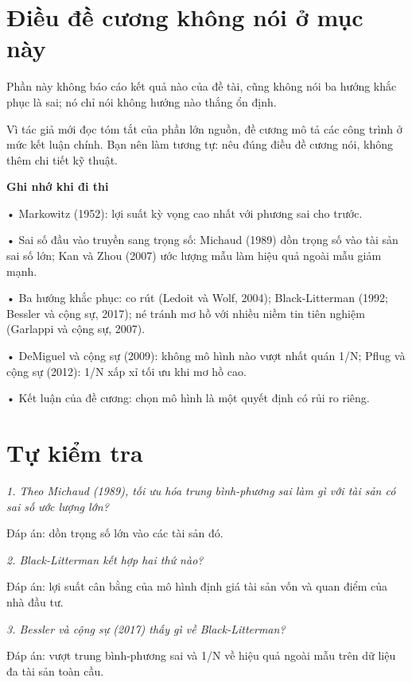 \section{Điều đề cương không nói ở mục này}

Phần này không báo cáo kết quả nào của đề tài, cũng không nói ba hướng khắc phục là sai; nó chỉ nói không hướng nào thắng ổn định.

Vì tác giả mới đọc tóm tắt của phần lớn nguồn, đề cương mô tả các công trình ở mức kết luận chính. Bạn nên làm tương tự: nêu đúng điều đề cương nói, không thêm chi tiết kỹ thuật.

\begin{tcolorbox}[breakable]
\textbf{Ghi nhớ khi đi thi}

• Markowitz (1952): lợi suất kỳ vọng cao nhất với phương sai cho trước.

• Sai số đầu vào truyền sang trọng số: Michaud (1989) dồn trọng số vào tài sản sai số lớn; Kan và Zhou (2007) ước lượng mẫu làm hiệu quả ngoài mẫu giảm mạnh.

• Ba hướng khắc phục: co rút (Ledoit và Wolf, 2004); Black-Litterman (1992; Bessler và cộng sự, 2017); né tránh mơ hồ với nhiều niềm tin tiên nghiệm (Garlappi và cộng sự, 2007).

• DeMiguel và cộng sự (2009): không mô hình nào vượt nhất quán 1/N; Pflug và cộng sự (2012): 1/N xấp xỉ tối ưu khi mơ hồ cao.

• Kết luận của đề cương: chọn mô hình là một quyết định có rủi ro riêng.
\end{tcolorbox}

\section{Tự kiểm tra}

{\itshape 1. Theo Michaud (1989), tối ưu hóa trung bình-phương sai làm gì với tài sản có sai số ước lượng lớn?\par}

Đáp án: dồn trọng số lớn vào các tài sản đó.

{\itshape 2. Black-Litterman kết hợp hai thứ nào?\par}

Đáp án: lợi suất cân bằng của mô hình định giá tài sản vốn và quan điểm của nhà đầu tư.

{\itshape 3. Bessler và cộng sự (2017) thấy gì về Black-Litterman?\par}

Đáp án: vượt trung bình-phương sai và 1/N về hiệu quả ngoài mẫu trên dữ liệu đa tài sản toàn cầu.

